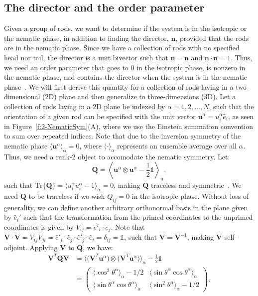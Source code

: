 \subsection{The director and the order parameter}
Given a group of rods, we want to determine if the system is in the isotropic or the nematic phase, in addition to finding the director, $\mathbf{n}$, provided that the rods are in the nematic phase.
Since we have a collection of rods with no specified head nor tail, the director is a unit bivector such that $\mathbf{n} = \mathbf{n}$ and $\mathbf{n}\cdot\mathbf{n} = 1$.
Thus, we need an order parameter that goes to $0$ in the isotropic phase, is nonzero in the nematic phase, and contains the director when the system is in the nematic phase~\cite{RN33,RN175}.
We will first derive this quantity for a collection of rods laying in a two-dimensional (2D) plane and then generalize to three-dimensions (3D).
Let a collection of rods laying in a 2D plane be indexed by $\alpha = 1,2,\dots, N$, such that the orientation of a given rod can be specified with the unit vector $\mathbf{u}^{\alpha} = u^{\alpha}_i\hat{e}_i$, as seen in Figure~\ref{f:2-NematicSym}(A), where we use the Einstein summation convention to sum over repeated indices.
Note that due to the inversion symmetry of the nematic phase $\langle \mathbf{u}^{\alpha}\rangle_{\alpha} = 0$, where $\langle \cdot \rangle_{\alpha}$ represents an ensemble average over all $\alpha$.
Thus, we need a rank-2 object to accomodate the nematic symmetry.
Let:
\begin{equation}
  \mathbf{Q} = \left \langle \mathbf{u}^{\alpha} \otimes \mathbf{u}^{\alpha} - \frac{1}{2} \mathbb{1} \right \rangle_{\alpha},\label{e:2-2DOrderRaw}
\end{equation}
such that $\textrm{Tr}\big \{ \mathbf{Q} \big \} = \langle u^{\alpha}_i u^{\alpha}_i - 1 \rangle_{\alpha} = 0$, making $\mathbf{Q}$ traceless and symmetric~\cite{RN33,RN175}.
We need $\mathbf{Q}$ to be traceless if we wish $Q_{ij} = 0$ in the isotropic phase.
Without loss of generality, we can define another arbitrary orthonormal basis in the plane given by $\hat{e}_i'$ such that the transformation from the primed coordinates to the unprimed coordinates is given by $V_{ij} = \hat{e}'_i \cdot \hat{e}_j$.
Note that $\mathbf{V} \cdot \mathbf{V} = V_{ij}V_{ji} = \hat{e}'_i \cdot \hat{e}_j \cdot \hat{e}'_j \cdot \hat{e}_i = \delta_{ij} = \mathbb{1}$, such that $\mathbf{V} = \mathbf{V}^{-1}$, making $\mathbf{V}$ self-adjoint.
Applying $\mathbf{V}$ to $\mathbf{Q}$, we have:
\begin{align}
  \mathbf{V}^T \mathbf{Q} \mathbf{V} &=
  \bigg \langle \big ( \mathbf{V}^T \mathbf{u}^{\alpha} \big ) \otimes \big ( \mathbf{V}^T \mathbf{u}^{\alpha} \big )\bigg \rangle_{\alpha}  - \frac{1}{2} \mathbb{1} \nonumber \\ & =
  \begin{pmatrix}
    \langle \cos^2 \theta^{\alpha}\rangle_{\alpha} - 1/2 & \langle \sin \theta^{\alpha} \cos \theta^{\alpha} \rangle_{\alpha} \\
    \langle \sin \theta^{\alpha} \cos \theta^{\alpha} \rangle_{\alpha} & \langle \sin^2 \theta^{\alpha} \rangle_{\alpha} - 1/2
  \end{pmatrix},\label{e:2-2DOrderRot}
\end{align}
